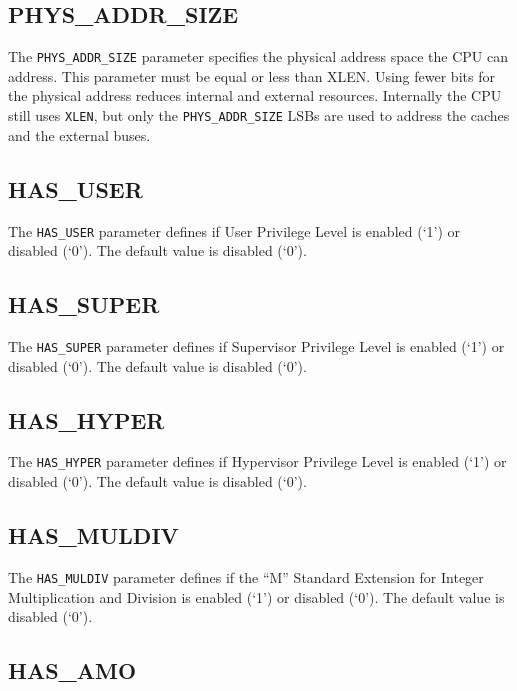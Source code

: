 \subsection{PHYS\_ADDR\_SIZE}\label{phys_addr_size}

The \texttt{PHYS\_ADDR\_SIZE} parameter specifies the physical address space the
CPU can address. This parameter must be equal or less than XLEN. Using
fewer bits for the physical address reduces internal and external
resources. Internally the CPU still uses \texttt{XLEN}, but only the
\texttt{PHYS\_ADDR\_SIZE} LSBs are used to address the caches and the external
buses.

\subsection{HAS\_USER}\label{has_user}

The \texttt{HAS\_USER} parameter defines if User Privilege Level is enabled (`1')
or disabled (`0'). The default value is disabled (`0').

\subsection{HAS\_SUPER}\label{has_super}

The \texttt{HAS\_SUPER} parameter defines if Supervisor Privilege Level is
enabled (`1') or disabled (`0'). The default value is disabled (`0').

\subsection{HAS\_HYPER}\label{has_hyper}

The \texttt{HAS\_HYPER} parameter defines if Hypervisor Privilege Level is
enabled (`1') or disabled (`0'). The default value is disabled (`0').

\subsection{HAS\_MULDIV}\label{has_muldiv}

The \texttt{HAS\_MULDIV} parameter defines if the ``M'' Standard Extension for
Integer Multiplication and Division is enabled (`1') or disabled (`0').
The default value is disabled (`0').

\subsection{HAS\_AMO}\label{has_amo}

